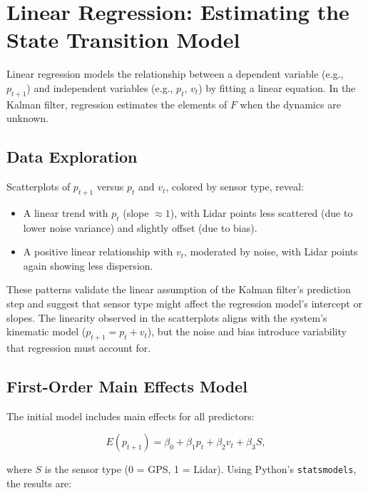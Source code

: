 \documentclass[12pt]{article}
\begin{document}
\section{Linear Regression: Estimating the State Transition Model}
\label{sec:regression}

Linear regression models the relationship between a dependent variable (e.g., \( p_{t+1} \)) and independent variables (e.g., \( p_t \), \( v_t \)) by fitting a linear equation. In the Kalman filter, regression estimates the elements of \( F \) when the dynamics are unknown.

\subsection{Data Exploration}
\label{subsec:data_exploration}

Scatterplots of \( p_{t+1} \) versus \( p_t \) and \( v_t \), colored by sensor type, reveal:
\begin{itemize}
    \item A linear trend with \( p_t \) (slope \(\approx 1\)), with Lidar points less scattered (due to lower noise variance) and slightly offset (due to bias).
    \item A positive linear relationship with \( v_t \), moderated by noise, with Lidar points again showing less dispersion.
\end{itemize}

These patterns validate the linear assumption of the Kalman filter’s prediction step and suggest that sensor type might affect the regression model’s intercept or slopes. The linearity observed in the scatterplots aligns with the system’s kinematic model (\( p_{t+1} = p_t + v_t \)), but the noise and bias introduce variability that regression must account for.

\subsection{First-Order Main Effects Model}
\label{subsec:main_effects}

The initial model includes main effects for all predictors:

\begin{equation}
    E(p_{t+1}) = \beta_0 + \beta_1 p_t + \beta_2 v_t + \beta_3 S,
    \label{eq:main_effects}
\end{equation}

where \( S \) is the sensor type (0 = GPS, 1 = Lidar). Using Python’s \texttt{statsmodels}, the results are:
\end{document}
